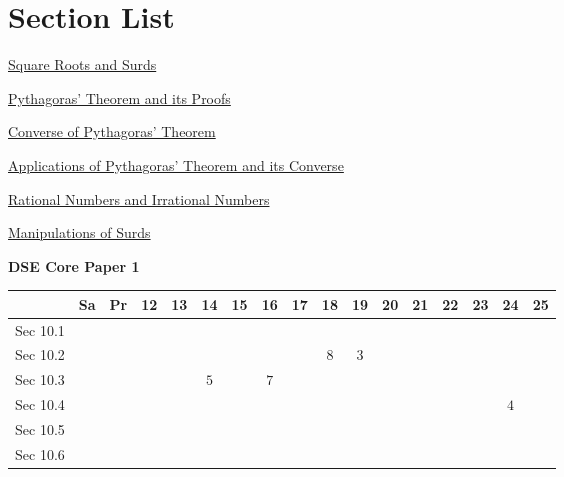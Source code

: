 \documentclass[12pt, a4paper]{article}
\begin{document}
\section*{Section List}
\begin{enumx}[label=Sec 10.\arabic*\ ]
\item \hyperref[section:2-10-1]{Square Roots and Surds}
\item \hyperref[section:2-10-2]{Pythagoras' Theorem and its Proofs}
\item \hyperref[section:2-10-3]{Converse of Pythagoras' Theorem}
\item \hyperref[section:2-10-4]{Applications of Pythagoras' Theorem and its Converse}
\item \hyperref[section:2-10-5]{Rational Numbers and Irrational Numbers}
\item \hyperref[section:2-10-6]{Manipulations of Surds \NF}
\end{enumx}
\begin{absolutelynopagebreak}
\begin{center}
\textbf{DSE Core Paper 1}
\end{center}
\begin{center}
\begin{tabular}{|l|c|c|c|c|c|c|c|c|c|c|c|c|c|c|c|c|}
\hline
        & Sa & Pr & 12 & 13 & 14 & 15 & 16 & 17 & 18 & 19 & 20 & 21 & 22 & 23 & 24 & 25 \\\hline\hline
Sec 10.1 &  &  &  &  &  &  &  &  &  &  &  &  &  &  &  &  \\\hline
Sec 10.2 &  &  &  &  &  &  &  &  &  $8$ &  $3$ &  &  &  &  &  &  \\\hline
Sec 10.3 &  &  &  &  &  $5$ &  &  $7$ &  &  &  &  &  &  &  &  &  \\\hline
Sec 10.4 &  &  &  &  &  &  &  &  &  &  &  &  &  &  &  $4$ &  \\\hline
Sec 10.5 &  &  &  &  &  &  &  &  &  &  &  &  &  &  &  &  \\\hline
Sec 10.6 &  &  &  &  &  &  &  &  &  &  &  &  &  &  &  &  \\\hline
\end{tabular}
\end{center}
\end{absolutelynopagebreak}
\end{document}
